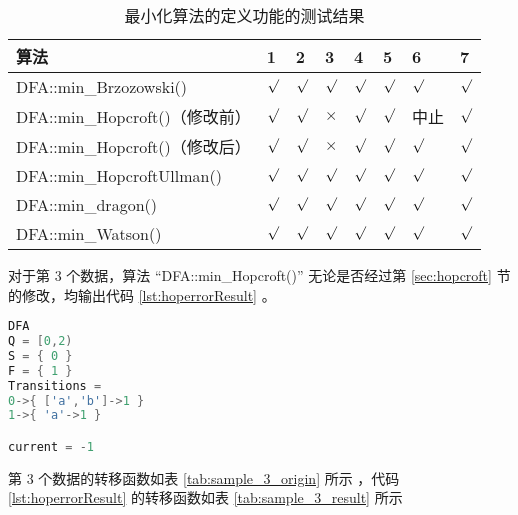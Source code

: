 \begin{table}[!htbp]
    \caption{ 最小化算法的定义功能的测试结果 }
    \label{tab:MinResult}
    \centering
    \small%
    \setlength{\tabcolsep}{4pt}%
    \renewcommand{\arraystretch}{1.2}%
    \begin{tabular}{l| p{2em}<{\centering} p{2em}<{\centering} p{2em}<{\centering} p{2em}<{\centering} p{2em}<{\centering} p{2em}<{\centering} p{2em}<{\centering} }  %
        \toprule %
        算法 & 1 & 2 & 3 & 4 &  5 & 6 & 7 \\
        \midrule
        DFA::min\_Brzozowski()        & $\surd$ & $\surd$ & $\surd$   & $\surd$ & $\surd$ & $\surd$     & $\surd$       \\
        DFA::min\_Hopcroft()（修改前） & $\surd$ & $\surd$ & $\times$  & $\surd$ & $\surd$ & 中止        & $\surd$       \\
        DFA::min\_Hopcroft()（修改后） & $\surd$ & $\surd$ & $\times$  & $\surd$ & $\surd$ & $\surd$     & $\surd$       \\
        DFA::min\_HopcroftUllman()    & $\surd$ & $\surd$ & $\surd$   & $\surd$ & $\surd$ & $\surd$     & $\surd$       \\
        DFA::min\_dragon()            & $\surd$ & $\surd$ & $\surd$   & $\surd$ & $\surd$ & $\surd$     & $\surd$       \\
        DFA::min\_Watson()            & $\surd$ & $\surd$ & $\surd$   & $\surd$ & $\surd$ & $\surd$     & $\surd$       \\
        \bottomrule%
    \end{tabular}
\end{table}

对于第 3 个数据，算法 “DFA::min\_Hopcroft()” 无论是否经过第 \ref{sec:hopcroft} 节的修改，均输出代码 \ref{lst:hoperrorResult} 。
\lstset{style=mystyle}
\begin{lstlisting}[language=C++,label={lst:hoperrorResult},caption={ 第 3 个数据在算法 “DFA::min\_Hopcroft()” 中的输出 }]
DFA
Q = [0,2)
S = { 0 }
F = { 1 }
Transitions =
0->{ ['a','b']->1 }
1->{ 'a'->1 }

current = -1
\end{lstlisting}

第 3 个数据的转移函数如表 \ref{tab:sample_3_origin} 所示 ，代码 \ref{lst:hoperrorResult} 的转移函数如表 \ref{tab:sample_3_result} 所示 

